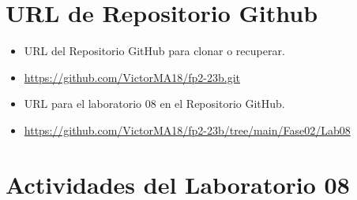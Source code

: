 \documentclass{article}
\begin{document}
	\section{URL de Repositorio Github}
	\begin{itemize}
		\item URL del Repositorio GitHub para clonar o recuperar.
		\item \url{https://github.com/VictorMA18/fp2-23b.git}
		\item URL para el laboratorio 08 en el Repositorio GitHub.
		\item \url{https://github.com/VictorMA18/fp2-23b/tree/main/Fase02/Lab08}
	\end{itemize}
	
	\section{Actividades del Laboratorio 08}
	
\end{document}
